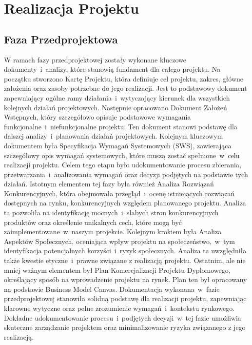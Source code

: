 
\chapter{Realizacja Projektu}
\label{ch:realizacja}


\section{Faza Przedprojektowa}
\label{sec:faza-przedprojektowa}

W ramach fazy przedprojektowej zostały wykonane kluczowe dokumenty~i~analizy, które stanowią fundament dla całego projektu.\newline
\indent Na początku stworzono Kartę Projektu, która definiuje cel projektu, zakres, główne założenia oraz zasoby potrzebne do jego realizacji. 
Jest to podstawowy dokument zapewniający ogólne ramy działania~i~wytyczający kierunek dla wszystkich kolejnych działań projektowych.
\indent Następnie opracowano Dokument Założeń Wstępnych, który szczegółowo opisuje podstawowe wymagania funkcjonalne~i~niefunkcjonalne projektu. 
Ten dokument stanowi podstawę dla dalszej analizy~i~planowania działań projektowych. \newline
\indent Kolejnym kluczowym dokumentem była Specyfikacja Wymagań Systemowych (SWS), 
zawierająca szczegółowy opis wymagań systemowych, które muszą zostać spełnione~w~celu realizacji projektu. 
Celem tego etapu było udokumentowanie procesu zbierania, przetwarzania~i~analizowania wymagań oraz decyzji podjętych na podstawie tych działań.\newline
\indent Istotnym elementem tej fazy była również Analiza Rozwiązań Konkurencyjnych, która obejmowała 
przegląd~i~ocenę istniejących rozwiązań dostępnych na rynku, konkurencyjnych względem planowanego projektu.
\indent Analiza ta pozwoliła na identyfikację mocnych~i~słabych stron konkurencyjnych produktów oraz określenie unikalnych cech, które mogą 
być zaimplementowane~w~naszym projekcie.\newline
\indent Kolejnym krokiem była Analiza Aspektów Społecznych, oceniająca wpływ projektu na społeczeństwo,~w~tym 
identyfikacja potencjalnych korzyści~i~ryzyk społecznych. Analiza ta uwzględniła także kwestie etyczne~i~prawne związane z realizacją projektu. \newline
\indent Ostatnim, ale nie mniej ważnym elementem był Plan Komercjalizacji Projektu Dyplomowego, określający
 sposób na wprowadzenie projektu na rynek. Plan ten był opracowany na podstawie Business Model Canvas.\newline
Dokumentacja wykonana~w~fazie przedprojektowej stanowiła solidną podstawę dla realizacji projektu, 
zapewniając klarowne wytyczne oraz pełne zrozumienie wymagań~i~kontekstu rynkowego. Dokładne udokumentowanie procesu~i~podjętych decyzji~w~tej fazie umożliwia skuteczne zarządzanie projektem oraz minimalizowanie ryzyka związanego z jego realizacją.



